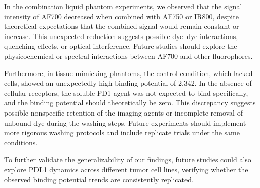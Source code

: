 In the combination liquid phantom experiments, we observed that the signal intensity of AF700 decreased when combined with AF750 or IR800, despite theoretical expectations that the combined signal would remain constant or increase. This unexpected reduction suggests possible dye–dye interactions, quenching effects, or optical interference. Future studies should explore the physicochemical or spectral interactions between AF700 and other fluorophores.

Furthermore, in tissue-mimicking phantoms, the control condition, which lacked cells, showed an unexpectedly high binding potential of 2.342. In the absence of cellular receptors, the soluble PD1 agent was not expected to bind specifically, and the binding potential should theoretically be zero. This discrepancy suggests possible nonspecific retention of the imaging agents or incomplete removal of unbound dye during the washing steps. Future experiments should implement more rigorous washing protocols and include replicate trials under the same conditions.

To further validate the generalizability of our findings, future studies could also explore PDL1 dynamics across different tumor cell lines, verifying whether the observed binding potential trends are consistently replicated.
